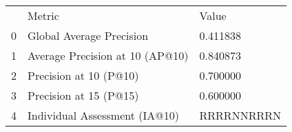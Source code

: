 \begin{tabular}{lll}
 & Metric & Value \\
0 & Global Average Precision & 0.411838 \\
1 & Average Precision at 10 (AP@10) & 0.840873 \\
2 & Precision at 10 (P@10) & 0.700000 \\
3 & Precision at 15 (P@15) & 0.600000 \\
4 & Individual Assessment (IA@10) & RRRRNNRRRN \\
\end{tabular}
